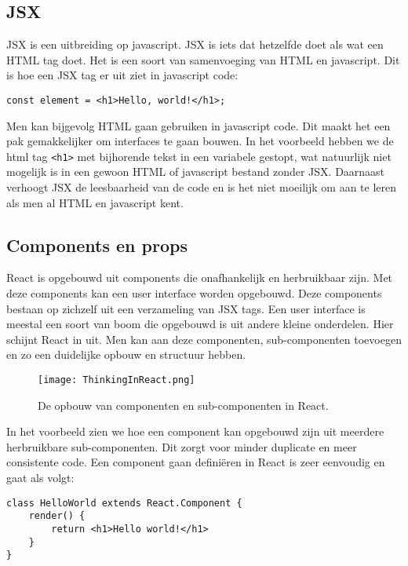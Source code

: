 \subsection{JSX}
\label{subsec:jsx}
JSX is een uitbreiding op javascript. JSX is iets dat hetzelfde doet als wat een HTML tag doet. Het is een soort van samenvoeging van HTML en javascript. Dit is hoe een JSX tag er uit ziet in javascript code: 

\begin{lstlisting}[frame=single, caption=Voorbeeld van een JSX tag]
const element = <h1>Hello, world!</h1>;
\end{lstlisting}

Men kan bijgevolg HTML gaan gebruiken in javascript code. Dit maakt het een pak gemakkelijker om interfaces te gaan bouwen. In het voorbeeld hebben we de html tag \lstinline[basicstyle=\ttfamily\color{red}]|<h1>| met bijhorende tekst in een variabele gestopt, wat natuurlijk niet mogelijk is in een gewoon HTML of javascript bestand zonder JSX. Daarnaast verhoogt JSX de leesbaarheid van de code en is het niet moeilijk om aan te leren als men al HTML en javascript kent.

\subsection{Components en props}
\label{subsec:components-en-props}
React is opgebouwd uit components die onafhankelijk en herbruikbaar zijn. Met deze components kan een user interface worden opgebouwd. Deze components bestaan op zichzelf uit een verzameling van JSX tags. Een user interface is meestal een soort van boom die opgebouwd is uit andere kleine onderdelen. Hier schijnt React in uit. Men kan aan deze componenten, sub-componenten toevoegen en zo een duidelijke opbouw en structuur hebben.

\begin{figure}
	\centering
	\texttt{[image: ThinkingInReact.png]}
	\caption{De opbouw van componenten en sub-componenten in React.}
	\label{fig:ar-vs-vr}
\end{figure}

In het voorbeeld zien we hoe een component kan opgebouwd zijn uit meerdere herbruikbare sub-componenten. Dit zorgt voor minder duplicate en meer consistente code. Een component gaan definiëren in React is zeer eenvoudig en gaat als volgt:

\begin{lstlisting}[frame=single, caption=Het component HelloWorld wordt gedefinieerd]
class HelloWorld extends React.Component {
	render() {
		return <h1>Hello world!</h1>
	}
}
\end{lstlisting}

